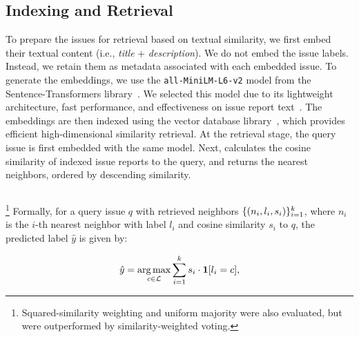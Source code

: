 \subsection{Indexing and Retrieval}
\label{sec:retrieval}
To prepare the issues for retrieval based on textual similarity, we first embed their textual content (i.e., \textit{title} + \textit{description}). We do not embed the issue labels. Instead, we retain them as metadata associated with each embedded issue. To generate the embeddings, we use the \texttt{all-MiniLM-L6-v2} model from the Sentence-Transformers library~\cite{reimers2019sentence}. We selected this model due to its lightweight architecture, fast performance, and effectiveness on issue report text~\cite{huang2025back}. The embeddings are then indexed using the  vector database library~\cite{douze2025faiss}, which provides efficient high-dimensional similarity retrieval. At the retrieval stage, the query issue is first embedded with the same model. Next,  calculates the cosine similarity of indexed issue reports to the query, and returns the  nearest neighbors, ordered by descending similarity.

\subsection{\votag}
\label{sec:approach-votag}
\footnote{Squared-similarity weighting and uniform majority were also evaluated, but were outperformed by similarity-weighted voting.}  Formally, for a
query issue $q$ with retrieved neighbors $\{(n_i, l_i, s_i)\}_{i=1}^{k}$, where
$n_i$ is the $i$-th nearest neighbor with label $l_i$ and cosine similarity $s_i$ to $q$, the predicted label $\hat{y}$ is given by:

\begin{equation}
    \hat{y} = \operatorname*{arg\,max}_{c \in \mathcal{L}}
    \sum_{i=1}^{k} s_i \cdot \mathbf{1}[l_i = c],
    \label{eq:votag}
\end{equation}

